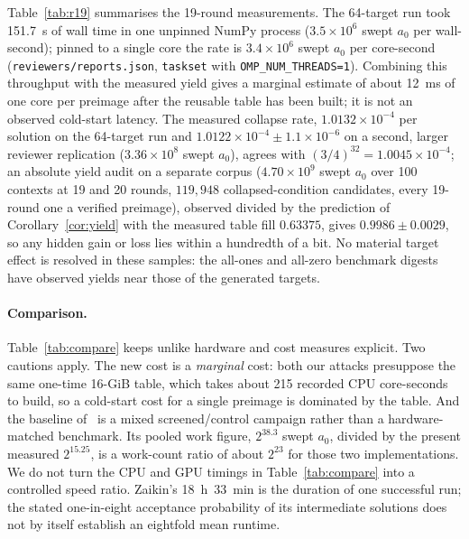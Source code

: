 \documentclass[11pt,a4paper]{article}
\begin{document}
Table~\ref{tab:r19} summarises the 19-round measurements.  The 64-target run took 151.7~s of wall time in one unpinned NumPy process
($3.5\times10^{6}$ swept $a_0$ per wall-second); pinned to a single core the
rate is $3.4\times10^{6}$ swept $a_0$ per core-second
(\texttt{reviewers/reports.json}, \texttt{taskset} with
\texttt{OMP\_NUM\_THREADS=1}).  Combining this throughput with the measured
yield gives a marginal estimate of about 12~ms of one core per preimage after
the reusable table has been built; it is not an observed cold-start latency.
The measured collapse rate,
$1.0132\times10^{-4}$ per solution on the 64-target run and
$1.0122\times10^{-4}\pm1.1\times10^{-6}$ on a second, larger reviewer
replication ($3.36\times10^{8}$ swept $a_0$), agrees with $(3/4)^{32}=
1.0045\times10^{-4}$; an absolute yield audit on a separate corpus ($4.70\times10^{9}$ swept $a_0$
over 100 contexts at 19 and 20 rounds, $119{,}948$ collapsed-condition
candidates, every 19-round one a verified preimage), observed divided by the
prediction of Corollary~\ref{cor:yield} with the measured table fill
$0.63375$, gives $0.9986\pm0.0029$, so any
hidden gain or loss lies within a hundredth of a bit.  No material target
effect is resolved in these samples: the all-ones and all-zero benchmark
digests have observed yields near those of the generated targets.

\paragraph{Comparison.}
Table~\ref{tab:compare} keeps unlike hardware and cost measures explicit.  Two cautions apply.  The
new cost is a \emph{marginal} cost: both our attacks presuppose the same
one-time 16-GiB table, which takes about 215 recorded CPU core-seconds to build, so a
cold-start cost for a single preimage is dominated by the table.  And the
baseline of~\cite{Basra2026R19} is a mixed screened/control campaign rather
than a hardware-matched benchmark.  Its pooled work figure, $2^{38.3}$ swept
$a_0$, divided by the present measured $2^{15.25}$, is a work-count ratio of
about $2^{23}$ for those two implementations.  We do not turn the CPU and GPU
timings in Table~\ref{tab:compare} into a controlled speed ratio.  Zaikin's
18~h~33~min is the duration of one successful run; the stated one-in-eight
acceptance probability of its intermediate solutions does not by itself
establish an eightfold mean runtime.
\end{document}

